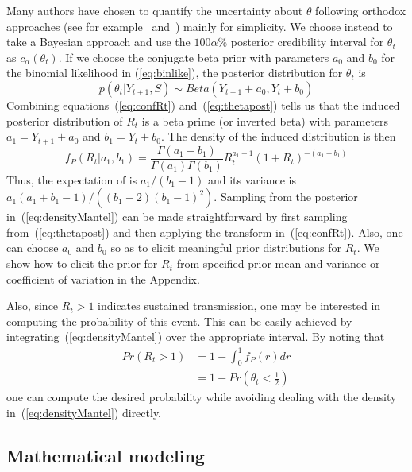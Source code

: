 Many authors have chosen to quantify the uncertainty about $\theta$ 
following orthodox approaches  (see for example~\cite{wilson} 
and~\cite{clopper}) mainly for simplicity.
We choose instead to take a Bayesian approach and use the  $100\alpha \%$ 
posterior credibility interval for $\theta_t$ as $c_{\alpha}(\theta_t)$.
If we choose the conjugate beta prior with parameters $a_0$ and $b_0$ for the 
binomial likelihood in (\ref{eq:binlike}), the posterior distribution for 
$\theta_t$ is
\begin{equation}
\label{eq:thetapost}
p(\theta_t| Y_{t+1}, S) \sim Beta(Y_{t+1} + a_0, Y_t + b_0)
\end{equation}
Combining equations~(\ref{eq:confRt}) and~(\ref{eq:thetapost}) 
tells us that the induced posterior distribution of $R_t$ is 
a beta prime (or inverted beta) with parameters $ a_1 = Y_{t+1} + a_0$ and $b_1 
=  Y_t + b_0$.
The density of the induced distribution is then 
\begin{equation}
\label{eq:densityMantel}
f_P(R_t| a_1, b_1) = \frac{\Gamma(a_1 + b_1)}{\Gamma(a_1)\Gamma(b_1)} R_t^{a_1 - 
1} (1 + R_t)^{-(a_1 + b_1)}
\end{equation}
Thus, the expectation of \rr is $a_1/(b_1 - 1)$ and its variance is 
$a_1(a_1 + b_1 - 1)/\left((b_1 - 2)(b_1 - 1)^2 \right) $.
Sampling from the posterior in~(\ref{eq:densityMantel}) can be made 
straightforward by first sampling from~(\ref{eq:thetapost}) and then applying 
the transform in~(\ref{eq:confRt}).
Also, one can choose $a_0$ and $b_0$ so as to elicit meaningful prior distributions
for $R_t$.
We show how to elicit the prior for $R_t$ from specified prior mean and variance
or coefficient of variation in the Appendix.

Also, since $R_t > 1$ indicates sustained transmission, one may be 
interested in computing the probability of this event.
This can be easily achieved by integrating~(\ref{eq:densityMantel}) over the 
appropriate interval.
By noting that
\begin{align}
\label{cumprobMantel}
Pr(R_t > 1) &= 1 - \int_0^1 f_P(r)dr \\
            &= 1- Pr(\theta_t < \frac{1}{2})
\end{align}
one can compute the desired probability while avoiding dealing with the density 
in~(\ref{eq:densityMantel}) directly.

\subsection*{Mathematical modeling} %

